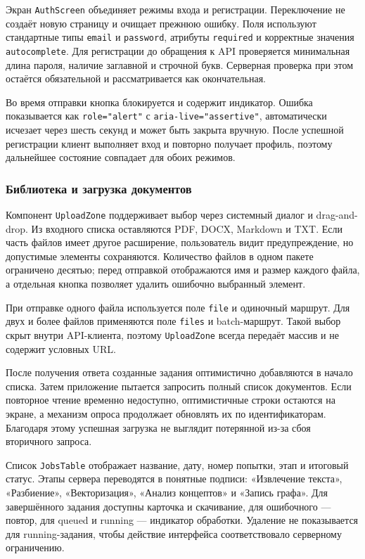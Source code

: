 Экран \texttt{AuthScreen} объединяет режимы входа и регистрации. Переключение не создаёт новую страницу и очищает прежнюю ошибку. Поля используют стандартные типы \texttt{email} и \texttt{password}, атрибуты \texttt{required} и корректные значения \texttt{autocomplete}. Для регистрации до обращения к API проверяется минимальная длина пароля, наличие заглавной и строчной букв. Серверная проверка при этом остаётся обязательной и рассматривается как окончательная.

Во время отправки кнопка блокируется и содержит индикатор. Ошибка показывается как \texttt{role="alert"} с \texttt{aria-live="assertive"}, автоматически исчезает через шесть секунд и может быть закрыта вручную. После успешной регистрации клиент выполняет вход и повторно получает профиль, поэтому дальнейшее состояние совпадает для обоих режимов.

\subsubsection{Библиотека и загрузка документов}

Компонент \texttt{UploadZone} поддерживает выбор через системный диалог и drag-and-drop. Из входного списка оставляются PDF, DOCX, Markdown и TXT. Если часть файлов имеет другое расширение, пользователь видит предупреждение, но допустимые элементы сохраняются. Количество файлов в одном пакете ограничено десятью; перед отправкой отображаются имя и размер каждого файла, а отдельная кнопка позволяет удалить ошибочно выбранный элемент.

При отправке одного файла используется поле \texttt{file} и одиночный маршрут. Для двух и более файлов применяются поле \texttt{files} и batch-маршрут. Такой выбор скрыт внутри API-клиента, поэтому \texttt{UploadZone} всегда передаёт массив и не содержит условных URL.

После получения ответа созданные задания оптимистично добавляются в начало списка. Затем приложение пытается запросить полный список документов. Если повторное чтение временно недоступно, оптимистичные строки остаются на экране, а механизм опроса продолжает обновлять их по идентификаторам. Благодаря этому успешная загрузка не выглядит потерянной из-за сбоя вторичного запроса.

Список \texttt{JobsTable} отображает название, дату, номер попытки, этап и итоговый статус. Этапы сервера переводятся в понятные подписи: «Извлечение текста», «Разбиение», «Векторизация», «Анализ концептов» и «Запись графа». Для завершённого задания доступны карточка и скачивание, для ошибочного --- повтор, для queued и running --- индикатор обработки. Удаление не показывается для running-задания, чтобы действие интерфейса соответствовало серверному ограничению.

